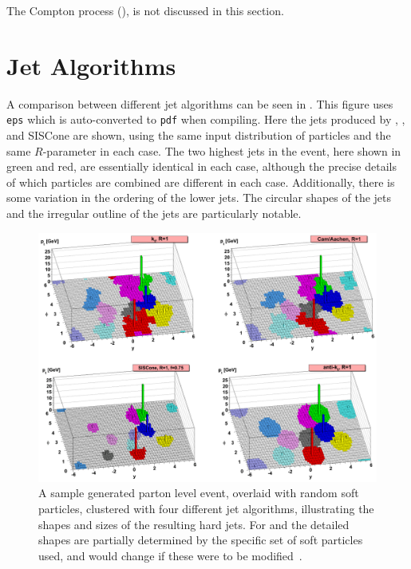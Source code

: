 The \QCD Compton process (), is not discussed in this section.

\section{Jet Algorithms}
\label{sec:bg-theory:jet_algorithms}
A comparison between different jet algorithms can be seen in .
This figure uses \texttt{eps} which is auto-converted to \texttt{pdf} when compiling.
Here the jets produced by \kt, \CA, \akt and SISCone are shown, using the same input distribution of particles and the same $R$-parameter in each case. 
The two highest \pT jets in the event, here shown in green and red, are essentially identical in each case, although the precise details of which particles are combined are different in each case.
Additionally, there is some variation in the ordering of the lower \pT jets.
The circular shapes of the \akt jets and the irregular outline of the \kt jets are particularly notable.

\begin{figure}[htpb]
  \centering
  \includegraphics[width=\largefigwidth]{chapters/1.theory/JetAlgComparison.eps}
  \caption{A sample \Herwig generated parton level event, overlaid with random soft particles, clustered with four different jet algorithms, illustrating the shapes and sizes of the resulting hard jets. For \kt and \CA the detailed shapes are partially determined by the specific set of soft particles used, and would change if these were to be modified~\cite{Cacciari:2005:fastjet,Cacciari:2012:fastjet}.}
  \label{fig:bg-theory:jet_algorithms}
\end{figure}
